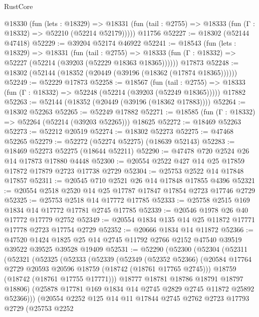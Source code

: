\begin{lexlean}{RustCore}
\begin{coremodule}
    @18330
      (fun (lets : @18329) =>
      @18331 (fun (tail : @2755) => @18333 (fun (Γ : @18332) => @52210 (@52214 @52179)))))
    @11756
@52227 := @18302 (@52144 @47418)
@52229 := @39204 @52174 @46922
@52241 := @18543
    (fun (lets : @18329) =>
    @18331
      (fun (tail : @2755) =>
      @18333 (fun (Γ : @18332) => @52227 (@52214 (@39203 (@52229 @18363 @18365))))))
    @17873
@52248 := @18302 (@52144 (@18352 (@20449 (@39196 (@18362 (@17874 @18365))))))
@52249 := @52229 @17873
@52258 := @18567
    (fun (tail : @2755) => @18333 (fun (Γ : @18332) => @52248 (@52214 (@39203 (@52249 @18365)))))
    @17882
@52263 := @52144 (@18352 (@20449 (@39196 (@18362 @17883))))
@52264 := @18302 @52263
@52265 := @52249 @17882
@52271 := @18585 (fun (Γ : @18332) => @52264 (@52214 (@39203 @52265))) @18625
@52272 := @18469 @52263
@52273 := @52212 @20519
@52274 := @18302 @52273
@52275 := @47468 @52265
@52279 := @52272 (@52274 @52275) (@18639 @52143)
@52283 := @18469 @52273 @52275 (@18644 @52211)
@52290 := @47478 @720 @2524 @26 @14 @17873 @17880 @4448
@52300 := @20554 @2522 @427 @14 @25 @17859 @17872 @17879 @2723 @17738 @2729
@52304 := @25753 @2522 @14 @17848 @17857
@52311 := @20545 @710 @2521 @26 @14 @17848 @17855 @4396
@52321 := @20554 @2518 @2520 @14 @25 @17787 @17847 @17854 @2723 @17746 @2729
@52325 := @25753 @2518 @14 @17772 @17785
@52333 := @25758 @2515 @169 @1834 @14 @17772 @17781 @2745 @17785
@52339 := @20546 @1978 @26 @40 @17772 @17779 @2752
@52349 := @20554 @1834 @135 @14 @25 @11872 @17771 @17778 @2723 @17754 @2729
@52352 := @20666 @1834 @14 @11872
@52366 := @47520
    @1424
    @1825
    @25
    @14
    @2745
    @11792
    @2766
    @2152
    @47540
    @39519
    @39522
    @39525
    @39528
    @19409
@52531 := @52290
    (@52300
      (@52304
        (@52311
          (@52321
            (@52325
              (@52333
                (@52339
                  (@52349
                    (@52352 @52366)
                    (@20584 @17764 @2729 @20593 @20596 @18759 (@18742 (@18761 @17765 @2745)))
                    @18759
                    (@18742 (@18761 @17755 @17771)))
                  @18777
                  @18781
                  @18786
                  @18791
                  @18797
                  @18806)
                (@25878 @17781 @169 @1834 @14 @2745 @2829 @2745 @11872 @25892 @52366)))
            (@20554
              @2252
              @125
              @14
              @11
              @17844
              @2745
              @2762
              @2723
              @17793
              @2729
              (@25753
                @2252

\end{coremodule}
\end{lexlean}
